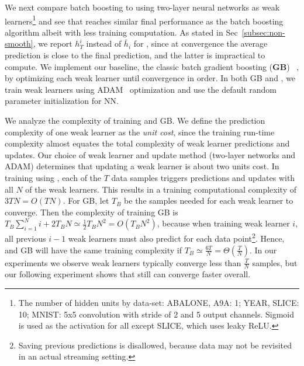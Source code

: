We next compare batch boosting to \algshort using two-layer neural networks as weak learners\footnote{The number of hidden units by data-set: ABALONE, A9A: 1; YEAR, SLICE: 10; MNIST: 5x5 convolution with stride of 2 and 5 output channels. Sigmoid is used as the activation for all except SLICE, which uses leaky ReLU. } and see that \algshort reaches  similar final performance as the batch boosting algorithm albeit with less training computation. 
As stated in Sec~\ref{subsec:non-smooth}, we report $h_T^i$ instead of $\bar{h}_i$ for \algshort, since at convergence the average prediction is close to the final prediction, and the latter is impractical to compute.  
We implement our baseline, the classic batch gradient boosting (\textbf{GB}) ~\citep{friedman2001greedy}, by optimizing each weak learner until convergence in order.
In both GB and \algshort, we train weak learners using ADAM~\citep{kingma2014adam} optimization and use the default random parameter initialization for NN.

We analyze the complexity of training \algshort and GB. We define the prediction complexity of one weak learner as the \textit{unit 
cost}, since the training run-time complexity almost equates the total complexity of weak learner predictions and updates. Our choice of weak learner and update method (two-layer networks and ADAM) determines that updating a weak learner is about two units cost. 
In training using \algshort, each of the $T$ data samples triggers predictions and updates with all $N$ of the weak learners. This results in a training computational complexity of $3TN = O(TN)$. For GB, let $T_B$ be the samples needed for each weak learner to converge. Then the complexity of training GB is $T_B \sum _{i=1}^N i +  2T_B N \simeq \frac{1}{2}T_BN^2= O(T_B N^2)$, because when training weak learner $i$, all previous $i-1$ weak learners must also predict for each data point\footnote{Saving previous predictions is disallowed, because data may not be revisited in an actual streaming setting.}. 
Hence, \algshort and GB will have the same training complexity if $T_B \simeq \frac{6T}{N} = \Theta(\frac{T}{N})$. In our experiments we observe weak learners typically converge less than $\frac{T}{N}$ samples, but our following experiment shows that \algshort still can converge faster overall.  

